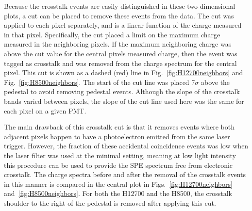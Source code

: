 Because the crosstalk events are easily distinguished in these two-dimensional plots, a cut can be placed to remove these events from the data. The cut was applied to each pixel separately, and is a linear function of the charge measured in that pixel. Specifically, the cut placed a limit on the maximum charge measured in the neighboring pixels. If the maximum neighboring charge was above the cut value for the central pixel\textquotesingle s measured charge, then the event was tagged as crosstalk and was removed from the charge spectrum for the central pixel. This cut is shown as a dashed (red) line in Fig.~\ref{fig:H12700neighbors} and Fig.~\ref{fig:H8500neighbors}. The start of the cut line was placed 7$\sigma$ above the pedestal to avoid removing pedestal events. Although the slope of the crosstalk bands varied between pixels, the slope of the cut line used here was the same for each pixel on a given PMT. 

The main drawback of this crosstalk cut is that it removes events where both adjacent pixels  happen to have a photoelectron emitted from the same laser trigger. However, the fraction of these accidental coincidence events was low when the laser filter was used at the minimal setting, meaning at low light intensity this procedure can be used to provide the SPE spectrum free from electronic crosstalk. The charge spectra before and after the removal of the crosstalk events in this manner is compared in the central plot in Figs.~\ref{fig:H12700neighbors} and~\ref{fig:H8500neighbors}. For both the H12700 and the H8500, the crosstalk shoulder to the right of the pedestal is removed after applying this cut. 
